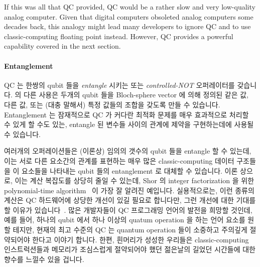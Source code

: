 If this was all that QC provided, QC would be a rather slow and very
low-quality analog computer.
Given that digital computers obsoleted analog computers some decades back,
this analogy might lead many developers to ignore QC and to
use classic-computing floating point instead.
However, QC provides a powerful capability covered in the next section.
\fi

\paragraph{Entanglement}

QC 는 한쌍의 qubit 들을 \emph{entangle} 시키는  또는
\emph{controlled-NOT} 오퍼레이터를 갖습니다.
 의 다른 사용은 두개의 qubit 들을 Bloch-sphere vector 에 의해 정의된
같은 값, 다른 값, 또는 (대충 말해서) 특정 값들의 조합을 갖도록 만들 수
있습니다.
Entanglement 는 잠재적으로 QC 가 커다란 최적화 문제를 매우 효과적으로 처리할 수
있게 할 수도 있는, entangle 된 변수들 사이의 관계에 제약을 구현하는데에 사용될
수 있습니다.

여러개의  오퍼레이션들은 (이론상) 임의의 갯수의 qubit 들을 entangle
할 수 있는데, 이는 서로 다른 요소간의 관계를 표현하는 매우 많은
classic-computing 데이터 구조들을 이 요소들을 나타내는 qubit 들의 entanglement
로 대체할 수 있습니다.
이론 상으로, 이는 계산 복잡도를 상당히 줄일 수 있는데, Shor 의 integer
factorization 을 위한 polynomial-time
algorithm~\cite{Shor:1997:PAP:264393.264406} 이 가장 잘 알려진 예입니다.
실용적으로는, 이런 종류의 계산은 QC 하드웨어에 상당한 개선이 있길 필요로
합니다만, 그런 개선에 대한 기대를 할 이유가
있습니다~\cite{RobertMcConnell2015QC-Entangle3000Atoms}.
많은 개발자들이 QC 프로그래밍 언어의 발전을 희망할 것인데, 예를 들어, 하나의
qubit 에서 하나 이상의 quatum operation 을 하는 언어 요소를 원할 테지만, 현재의
최고 수준의 QC 는 quantum operation 들이 소중하고 주의깊게 절약되어야 한다고
이야기 합니다.
한편, 흰머리가 성성한 우리들은 classic-computing 인스트럭션들과 메모리가
조심스럽게 절약되어야 했던 젊은날의 길었던 시간들에 대한 향수를 느낄수 있을
겁니다.
\iffalse

